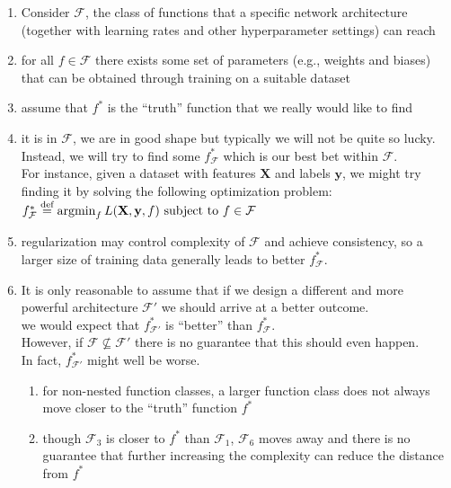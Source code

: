 \begin{enumerate}[itemsep=0.15cm]
    \item Consider $\mathcal{F}$, the class of functions that a specific network architecture (together with learning rates and other hyperparameter settings) can reach

    \item for all $f \in \mathcal{F}$ there exists some set of parameters (e.g., weights and biases) that can be obtained through training on a suitable dataset

    \item assume that $f^\ast$ is the “truth” function that we really would like to find

    \item  it is in $\mathcal{F}$, we are in good shape but typically we will not be quite so lucky.\\
    Instead, we will try to find some $f_\mathcal{F}^\ast$ which is our best bet within $\mathcal{F}$.\\
    For instance, given a dataset with features $\mathbf{X}$ and labels $\mathbf{y}$, we might try finding it by solving the following optimization problem:
    $
        \hfill
        f^*_\mathcal{F} \stackrel{\textrm{def}}{=} \mathop{\mathrm{argmin}}_f L(\mathbf{X}, \mathbf{y}, f) \textrm{ subject to } f \in \mathcal{F}
        \hfill
    $

    \item regularization may control complexity of $\mathcal{F}$ and achieve consistency, so a larger size of training data generally leads to better $f^*_\mathcal{F}$.

    \item It is only reasonable to assume that if we design a different and more powerful architecture $\mathcal{F}'$ we should arrive at a better outcome.\\
    we would expect that $f^*_{\mathcal{F}'}$ is “better” than $f^*_{\mathcal{F}}$.\\
    However, if $\mathcal{F} \not\subseteq \mathcal{F}'$ there is no guarantee that this should even happen.\\
    In fact, $f^*_{\mathcal{F}'}$ might well be worse.
    \begin{enumerate}
        \item for non-nested function classes, a larger function class does not always move closer to the “truth” function $f^*$

        \item though $\mathcal{F}_3$ is closer to $f^*$ than $\mathcal{F}_1$, $\mathcal{F}_6$ moves away and there is no guarantee that further increasing the complexity can reduce the distance from $f^*$


\end{enumerate}
\end{enumerate}
